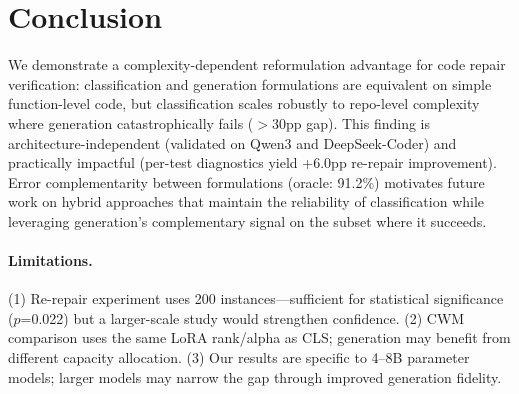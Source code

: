 \documentclass[11pt]{article}
\begin{document}
\section{Conclusion}

We demonstrate a complexity-dependent reformulation advantage for code repair verification: classification and generation formulations are equivalent on simple function-level code, but classification scales robustly to repo-level complexity where generation catastrophically fails ($>$30pp gap). This finding is architecture-independent (validated on Qwen3 and DeepSeek-Coder) and practically impactful (per-test diagnostics yield +6.0pp re-repair improvement). Error complementarity between formulations (oracle: 91.2\%) motivates future work on hybrid approaches that maintain the reliability of classification while leveraging generation's complementary signal on the subset where it succeeds.

\paragraph{Limitations.} (1) Re-repair experiment uses 200 instances---sufficient for statistical significance ($p$=0.022) but a larger-scale study would strengthen confidence. (2) CWM comparison uses the same LoRA rank/alpha as CLS; generation may benefit from different capacity allocation. (3) Our results are specific to 4--8B parameter models; larger models may narrow the gap through improved generation fidelity.



\end{document}

